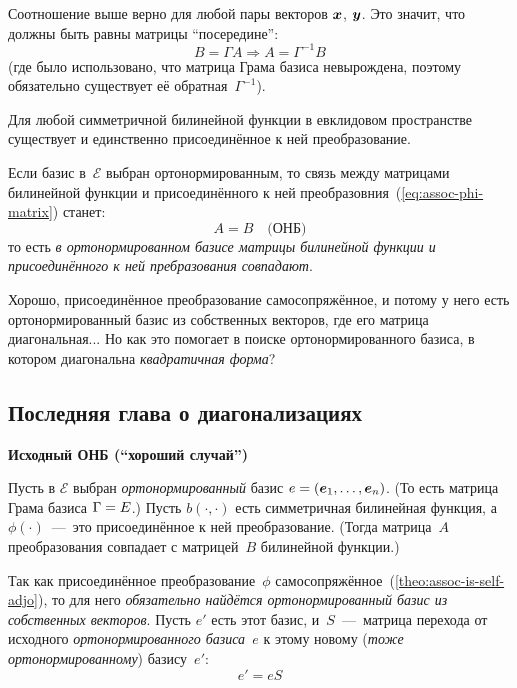 \documentclass[a4paper,12pt]{article}
\theoremstyle{remark}
\begin{document}
  Соотношение выше верно для любой пары векторов $\boldsymbol x$, $\boldsymbol y$.
  Это значит, что должны быть равны матрицы ``посередине'':
  \begin{equation}\label{eq:assoc-phi-matrix}
    B = \Gamma A \Rightarrow \boxed{A = \Gamma^{-1} B}
  \end{equation}
  (где было использовано, что матрица Грама базиса невырождена, поэтому обязательно существует её обратная~$\Gamma^{-1}$).
  
  \begin{proposition}
    Для любой симметричной билинейной функции в евклидовом пространстве существует и единственно присоединённое к ней преобразование.
  \end{proposition}
  
  Если базис в~$\mathcal E$ выбран ортонормированным, то связь между матрицами билинейной функции и присоединённого к ней преобразовния~(\ref{eq:assoc-phi-matrix}) станет:
  \begin{equation}\label{eq:assoc-phi-matrix}
    \boxed{A = B\quad \mbox{(ОНБ)}}
  \end{equation}
  то есть \emph{в ортонормированном базисе матрицы билинейной функции и присоединённого к ней пребразования совпадают}.
  
  Хорошо, присоединённое преобразование самосопряжённое, и потому у него есть ортонормированный базис из собственных векторов, где его матрица диагональная...
  Но как это помогает в поиске ортонормированного базиса, в котором диагональна \emph{квадратичная форма}?

  
  
  \newpage
  
  \subsection{Последняя глава о диагонализациях}
  
  \noindent
  \textbf{Исходный ОНБ (``хороший случай'')}

  Пусть в $\mathcal E$ выбран \emph{ортонормированный} базис $e \hm= (\bds e_1, \ldots, \bds e_n)$.
  (То есть матрица Грама базиса $\Gamma \hm= E$.)
  Пусть $b(\cdot, \cdot)$ есть симметричная билинейная функция, а $\phi(\cdot)$~---~это присоединённое к ней преобразование.
  (Тогда матрица~$A$ преобразования совпадает с матрицей~$B$ билинейной функции.)

  Так как присоединённое преобразование~$\phi$ самосопряжённое~(\ref{theo:assoc-is-self-adjo}), то для него \emph{обязательно найдётся ортонормированный базис из собственных векторов}.
  Пусть $e'$ есть этот базис, и~$S$~---~матрица перехода от исходного \emph{ортонормированного базиса~$e$} к этому новому (\emph{тоже ортонормированному}) базису~$e'$:
  \begin{equation}\label{eq:from-orthogo-to-orthogo-basis}
    e' = e S
  \end{equation}
  
\end{document}
